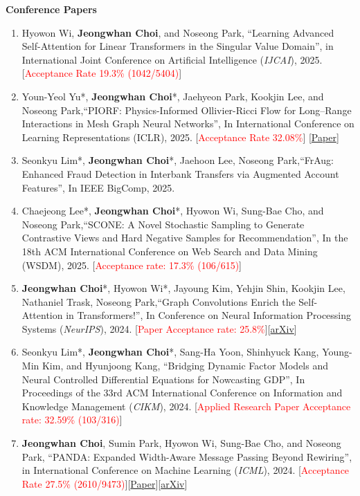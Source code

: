 \documentclass[10pt]{article}
\newenvironment{changemargin}[2]{
  \begin{list}{}{
    \setlength{\topsep}{0pt}
    \setlength{\leftmargin}{#1}
    \setlength{\rightmargin}{#2}
    \setlength{\listparindent}{\parindent}
    \setlength{\itemindent}{\parindent}
    \setlength{\parsep}{\parskip}
  }
  \item[]}{\end{list}
}
\newcommand{\RED}[1]{\textcolor{red}{#1}}
\newenvironment{body} {
	\vspace*{-16pt}
	\begin{changemargin}{-0.25in}{-0.5in}
  }
	{\end{changemargin}
}
\begin{document}
\begin{body}
\textbf{Conference Papers}
\begin{enumerate}
    \item Hyowon Wi, \textbf{Jeongwhan Choi}, and Noseong Park, ``Learning Advanced Self-Attention for Linear Transformers in the Singular Value Domain'', in International Joint Conference on Artificial Intelligence (\textit{IJCAI}), 2025. [\RED{Acceptance Rate 19.3\% (1042/5404)}]
    \item Youn-Yeol Yu*, \textbf{Jeongwhan Choi}*, Jaehyeon Park, Kookjin Lee, and Noseong Park,``PIORF: Physics-Informed Ollivier-Ricci Flow for Long–Range Interactions in Mesh Graph Neural Networks'', In International Conference on Learning Representations (ICLR), 2025. [\RED{Acceptance Rate 32.08\%}] [\href{https://openreview.net/forum?id=qkBBHixPow}{Paper}]
    \item Seonkyu Lim*, \textbf{Jeongwhan Choi}*, Jaehoon Lee, Noseong Park,``FrAug: Enhanced Fraud Detection in Interbank Transfers via Augmented Account Features'', In IEEE BigComp, 2025.
    \item Chaejeong Lee*, \textbf{Jeongwhan Choi}*, Hyowon Wi,  Sung-Bae Cho, and Noseong Park,``SCONE: A Novel Stochastic Sampling to Generate Contrastive Views and Hard Negative Samples for Recommendation'', In the 18th ACM International Conference on Web Search and Data Mining (WSDM), 2025. [\RED{Acceptance rate: 17.3\% (106/615)}]
    \item \textbf{Jeongwhan Choi}*, Hyowon Wi*, Jayoung Kim, Yehjin Shin, Kookjin Lee, Nathaniel Trask, Noseong Park,``Graph Convolutions Enrich the Self-Attention in Transformers!'', In Conference on Neural Information Processing Systems (\textit{NeurIPS}), 2024. [\RED{Paper Acceptance rate: 25.8\%}][\href{https://arxiv.org/abs/2312.04234}{arXiv}]
    \item Seonkyu Lim*, \textbf{Jeongwhan Choi}*, Sang-Ha Yoon, Shinhyuck Kang, Young-Min Kim, and Hyunjoong Kang, ``Bridging Dynamic Factor Models and Neural Controlled Differential Equations for Nowcasting GDP'', In Proceedings of the 33rd ACM International Conference on Information and Knowledge Management (\textit{CIKM}), 2024. [\RED{Applied Research Paper Acceptance rate: 32.59\% (103/316)}]
    \item \textbf{Jeongwhan Choi}, Sumin Park, Hyowon Wi,  Sung-Bae Cho, and Noseong Park, ``PANDA: Expanded Width-Aware Message Passing Beyond Rewiring'', in International Conference on Machine Learning (\textit{ICML}), 2024. [\RED{Acceptance Rate 27.5\% (2610/9473)}][\href{https://proceedings.mlr.press/v235/choi24f.html}{Paper}][\href{https://arxiv.org/abs/2406.03671}{arXiv}]

\end{enumerate}
\end{body}
\end{document}
